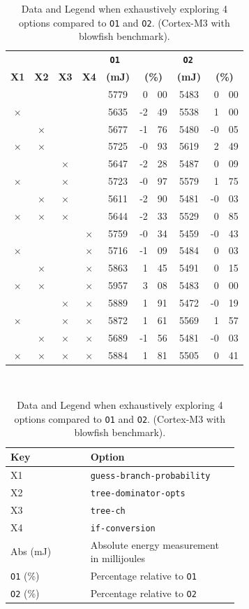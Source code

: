 \documentclass[twocolumn]{article}
\newcommand{\tY}{\checkmark}
\newcommand{\tN}{$\times$}
\let\oldcaption\caption
\renewcommand{\caption}[1]{\oldcaption{\textup{#1}}}
\begin{document}
\begin{table}[tb]
	\centering
	\begin{tabular}{c c c c c r@{.}l c r@{.}l }
		& & & \multicolumn{3}{c}{\hspace{1.5cm}\bfseries \texttt{O1}} & \multicolumn{3}{c}{\hspace{1.3cm}\bfseries \texttt{O2}} \\
		\bfseries X1 & \bfseries X2 & \bfseries X3 & \bfseries X4 & \bfseries (mJ) 	 & \multicolumn{2}{c}{\bfseries (\%)} &
		\bfseries (mJ) 	 & \multicolumn{2}{c}{\bfseries (\%)} \\
		\hline
		\tY&\tY&\tY&\tY& 5779 & 0&00 	&  5483 &  0&00\\
		\tN&\tY&\tY&\tY& 5635 & -2&49 	&  5538 &  1&00\\
		\tY&\tN&\tY&\tY& 5677 & -1&76 	&  5480 & -0&05\\
		\tN&\tN&\tY&\tY& 5725 & -0&93 	&  5619 &  2&49\\
		\tY&\tY&\tN&\tY& 5647 & -2&28 	&  5487 &  0&09\\
		\tN&\tY&\tN&\tY& 5723 & -0&97 	&  5579 &  1&75\\
		\tY&\tN&\tN&\tY& 5611 & -2&90 	&  5481 &  -0&03\\
		\tN&\tN&\tN&\tY& 5644 & -2&33 	&  5529 &  0&85\\

		\tY&\tY&\tY&\tN& 5759 & -0&34 	&  5459 &  -0&43\\
		\tN&\tY&\tY&\tN& 5716 & -1&09 	&  5484 &  0&03\\
		\tY&\tN&\tY&\tN& 5863 & 1&45 	&  5491 &  0&15\\
		\tN&\tN&\tY&\tN& 5957 & 3&08 	&  5483 &  0&00\\
		\tY&\tY&\tN&\tN& 5889 & 1&91 	&  5472 &  -0&19\\
		\tN&\tY&\tN&\tN& 5872 & 1&61 	&  5569 &  1&57\\
		\tY&\tN&\tN&\tN& 5689 & -1&56 	&  5481 &  -0&03\\
		\tN&\tN&\tN&\tN& 5884 & 1&81 	&  5505 &  0&41\\
	\end{tabular}\\[1em]

	\begin{tabular}{l p{0.65\linewidth}}
		\bfseries Key & \bfseries Option \\
		\hline
		X1 & \texttt{guess-branch-probability}  \\
		X2 & \texttt{tree-dominator-opts}  \\
		X3 & \texttt{tree-ch} \\
		X4 & \texttt{if-conversion} \\
		Abs (mJ) & Absolute energy measurement in millijoules \\
		\texttt{O1} (\%) & Percentage relative to \texttt{O1} \\
		\texttt{O2} (\%) & Percentage relative to \texttt{O2} \\
	\end{tabular}
	\caption{Data and Legend when exhaustively exploring 4 options compared to \texttt{O1} and \texttt{O2}. (Cortex-M3 with blowfish benchmark).}
	\label{Table:Exhaustive}
\end{table}
\end{document}
